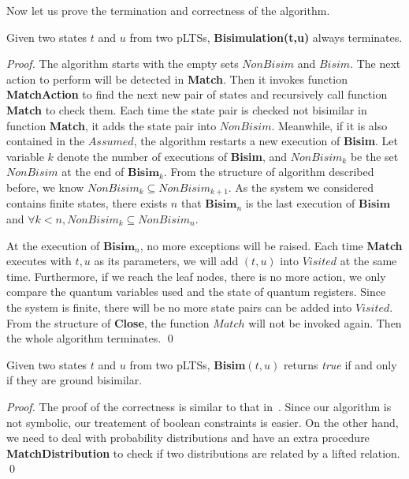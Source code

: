\documentclass[runningheads]{llncs}
\begin{document}
Now let us prove the termination and correctness of the algorithm. 


\begin{theorem}[Termination]\label{thm:strong_alg_termination}
Given two states $t$ and $u$ from two pLTSs, \textbf{Bisimulation(t,u)} always terminates.
\end{theorem} 
\begin{proof}
The algorithm starts with the empty sets $NonBisim$ and $Bisim$. The next action to perform will be detected in \textbf{Match}. Then it invokes function \textbf{MatchAction} to find the next new pair of states and recursively call function \textbf{Match} to check them. Each time the state pair is checked not bisimilar in function \textbf{Match}, it adds the state pair into $NonBisim$. Meanwhile, if it is also contained in the $Assumed$, the algorithm restarts a new execution of \textbf{Bisim}. Let variable $k$ denote the number of executions of \textbf{Bisim}, and $NonBisim_{k}$ be the set $NonBisim$ at the end of $\textbf{Bisim}_{k}$. From the structure of algorithm described before, we know $NonBisim_{k}\subseteq NonBisim_{k+1}$. As the system we considered contains finite states, there exists $n$ that $\textbf{Bisim}_{n}$ is the last execution of $\textbf{Bisim}$ and $\forall k<n, NonBisim_{k}\subseteq NonBisim_{n}$.

At the execution of $\textbf{Bisim}_{n}$, no more exceptions will be raised. Each time \textbf{Match} executes with $t,u$ as its parameters, we will add $(t,u)$ into $Visited$ at the same time. Furthermore, if we reach the leaf nodes, there is no more action, we only compare the quantum variables used and the state of quantum registers. Since the system is finite, there will be no more state pairs can be added into $Visited$. From the structure of \textbf{Close}, the function $Match$ will not be invoked again.  Then the whole algorithm terminates.
\qed
\end{proof}

\begin{theorem}[Correctness]\label{thm:strong_alg_correctness}
Given two states $t$ and $u$ from two pLTSs, \textbf{Bisim}$(t,u)$ returns \textit{true} if and only if they are ground bisimilar.
\end{theorem} 
\begin{proof}
The proof of the correctness is similar to that in~\cite{HL95}. Since our algorithm is not symbolic, our treatement of boolean constraints is easier. On the other hand, we need to deal with probability distributions and have an extra procedure \textbf{MatchDistribution} to check if two distributions are related by a lifted relation.
\qed
\end{proof}
\end{document}

